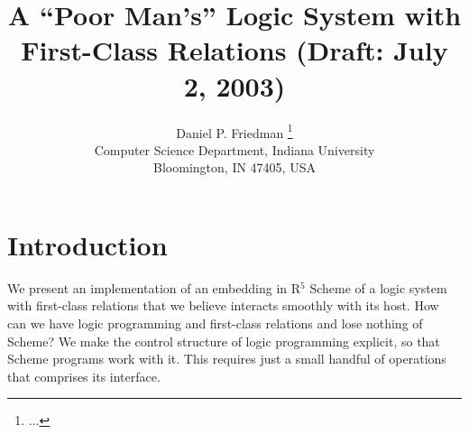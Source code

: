 \RequirePackage{alltt}


\newcommand{\comment}[1]{}

\def\myrule{\raisebox{3.4ex}[1.5ex][.75ex]{\rule{126mm}{.01mm}}{\vspace{-3ex}}\\}
\def\codefontsize{\fontsize{9}{10}\selectfont\tt} 
\def\inlinecode#1{\hbox{\codefontsize #1\/}}
\long\def\inlinecodebreak#1{{\codefontsize #1\/}}
\newenvironment{verbatimcode}%
  {\endgraf\codefontsize\verbatim}%
  {\endverbatim}
\newenvironment{ttcode}
  {\codefontsize\begin{alltt}}
  {\end{alltt}}
\def\Di{$D_i$}
\def\Ds{$D_s$}
\newcommand{\Rule}[4]{
\makebox{{\rm #1}
$\displaystyle
\frac{\begin{array}{l}#2\\\end{array}}
{\begin{array}{l}#3\\\end{array}}$
 #4}}





\title{A ``Poor Man's'' Logic System with First-Class Relations
(Draft: July 2, 2003)} \author[Friedman]{Daniel
P. Friedman \thanks{...}
\\ Computer Science Department, Indiana University 
\\ Bloomington, IN 47405, USA
}
\maketitle[t]

\section{Introduction}
We present an implementation of an embedding in R$^5$
Scheme of a logic system with first-class relations
that we believe interacts smoothly with its host.  How can we have
logic programming and first-class relations and lose nothing of
Scheme?  We make the control structure of logic programming explicit,
so that Scheme programs work with it.  This requires just a small
handful of operations that comprises its interface.

